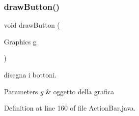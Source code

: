 \subsubsection{\texorpdfstring{draw\+Button()}{drawButton()}}
{\footnotesize\ttfamily void draw\+Button (\begin{DoxyParamCaption}\item[{Graphics}]{g }\end{DoxyParamCaption})}



disegna i bottoni. 


\begin{DoxyParams}{Parameters}
{\em g} & oggetto della grafica \\
\hline
\end{DoxyParams}


Definition at line 160 of file Action\+Bar.\+java.

